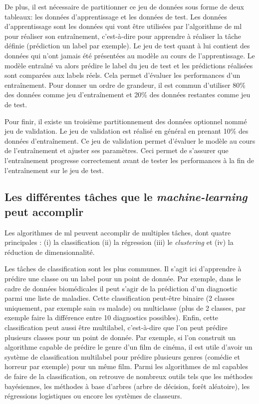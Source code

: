 De plus, il est nécessaire de partitionner ce jeu de données sous forme de deux tableaux: les données d'apprentissage et les données de test. Les données d'apprentissage sont les données qui vont être utilisées par l'algorithme de \gls{ml} pour réaliser son entraînement, c'est-à-dire pour apprendre à réaliser la tâche définie (prédiction un label par exemple). Le jeu de test quant à lui contient des données qui n'ont jamais été présentées au modèle au cours de l'apprentissage. Le modèle entraîné va alors prédire le label du jeu de test et les prédictions réalisées sont comparées aux labels réels. Cela permet d'évaluer les performances d'un entraînement. Pour donner un ordre de grandeur, il est commun d'utiliser 80\% des données comme jeu d'entraînement et 20\% des données restantes comme jeu de test.

Pour finir, il existe un troisième partitionnement des données optionnel nommé jeu de validation. Le jeu de validation est réalisé en général en prenant 10\% des données d'entraînement. Ce jeu de validation permet d'évaluer le modèle au cours de l'entraînement et  ajuster ses paramètres. Ceci permet de s'assurer que l'entraînement progresse correctement avant de tester les performances à la fin de l'entraînement sur le jeu de test.

\subsection{Les différentes tâches que le \textit{machine-learning} peut accomplir}
Les algorithmes de \gls{ml} peuvent accomplir de multiples tâches, dont quatre principales : (i) la classification (ii) la régression (iii) le \textit{clustering} et (iv) la réduction de dimensionnalité.

Les tâches de classification sont les plus communes. Il s'agit ici d'apprendre à prédire une classe ou un label pour un point de donnée. Par exemple, dans le cadre de données biomédicales il peut s'agir de la prédiction d'un diagnostic parmi une liste de maladies. Cette classification peut-être binaire (2 classes uniquement, par exemple sain \textit{vs} malade) ou multiclasse (plus de 2 classes, par exemple faire la différence entre 10 diagnostics possibles). Enfin, cette classification peut aussi être multilabel, c'est-à-dire que l'on peut prédire plusieurs classes pour un point de donnée. Par exemple, si l’on construit un algorithme capable de prédire le genre d'un film de cinéma, il est utile d'avoir un système de classification multilabel pour prédire plusieurs genres (comédie et horreur par exemple) pour un même film. Parmi les algorithmes de \gls{ml} capables de faire de la classification, on retrouve de nombreux outils tels que les méthodes bayésiennes, les méthodes à base d'arbres (arbre de décision, forêt aléatoire), les régressions logistiques ou encore les systèmes de classeurs.

